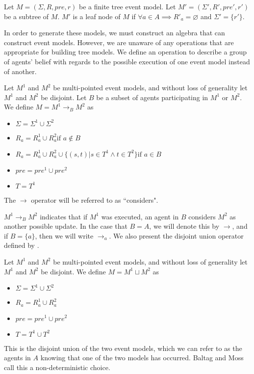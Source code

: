 \begin{defn} \label{leaf}
Let $M = (\Sigma, R, pre, r)$ be a finite tree event model.
Let $M' = (\Sigma', R', pre', r')$ be a subtree of $M$.
$M'$ is a leaf node of $M$ if $\forall a \in A \implies R'_a = \varnothing$ and $\Sigma' = \{ r'\}$.
\end{defn}

In order to generate these models, we must construct an algebra that can construct event models.
However, we are unaware of any operations that are appropriate for building tree models.
We define an operation to describe a group of agents' belief with regards to the possible execution
of one event model instead of another.

\begin{defn} \label{considers}
Let $M^1$ and $M^2$ be multi-pointed event models, and without loss of
generality let $M^1$ and $M^2$ be disjoint.
Let $B$ be a subset of agents participating in $M^1$ or $M^2$.
We define $M = M^1 \to_B M^2$ as 
\begin{itemize}
  \item $\Sigma = \Sigma^1 \cup \Sigma^2$
  \item $R_a = R^1_a \cup R^2_a \text{if } a \notin B$
	\item $R_a =
      R^1_a \cup
      R^2_a \cup
      \{(s,t) | s \in T^1 \land t \in T^2 \}
    \text{if } a \in B $
  \item $pre = pre^1 \cup pre^2$
  \item $T = T^1$
\end{itemize}
The $\to$ operator will be referred to as ``considers".
\end{defn}

$M^1 \to_B M^2$ indicates that if $M^1$ was executed, an agent in $B$ considers $M^2$ as another
possible update.
In the case that $B = A$, we will denote this by $\to$, and if $B = \{a\}$, then
we will write $\to_a$.
We also present the disjoint union operator defined by \FIXME.


\begin{defn} \label{disjoint}
Let $M^1$ and $M^2$ be multi-pointed event models, and without loss of generality let $M^1$ and
$M^2$ be disjoint.
We define $M = M^1 \sqcup M^2$ as
\begin{itemize}
	\item $\Sigma = \Sigma^1 \cup \Sigma^2$
	\item $R_a = R^1_a \cup R^2_a$
	\item $pre = pre^1 \cup pre^2$
	\item $T = T^1 \cup T^2$
\end{itemize}
\end{defn}
This is the disjoint union of the two event models, which we can refer to as the agents in $A$
knowing that one of the two models has occurred.
Baltag and Moss call this a non-deterministic choice.

